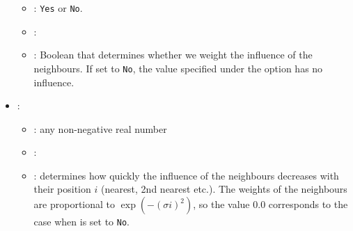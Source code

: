 \begin{itemize}
\begin{itemize}
                \item \optionPossibleValues{}: {\tt Yes} or {\tt No}.
                \item \optionDefaultValue{}: 
                \item \optionDescrption{}: Boolean that determines whether we weight the influence of the neighbours. If set to {\tt No},
                                           the value specified under the option  has no influence.
           \end{itemize}
    \item {}:
           \begin{itemize}
                \item \optionPossibleValues{}: any non-negative real number
                \item \optionDefaultValue{}: 
                \item \optionDescrption{}: determines how quickly the influence of the neighbours decreases with their position $i$ (nearest, 2nd nearest etc.).
                                           The weights of the neighbours are proportional to $\exp(-(\sigma i)^2)$, so the value $0.0$ corresponds to
                                           the case when   is set to {\tt No}.
           \end{itemize}
\end{itemize}
